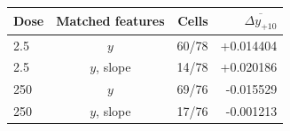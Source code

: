 \begin{tabular}{lcrr}
\toprule
Dose & Matched features & Cells & $\overline{\Delta y_{+10}}$ \\
\midrule
2.5 & $y$ & 60/78 & +0.014404 \\
2.5 & $y$, slope & 14/78 & +0.020186 \\
250 & $y$ & 69/76 & -0.015529 \\
250 & $y$, slope & 17/76 & -0.001213 \\
\bottomrule
\end{tabular}
